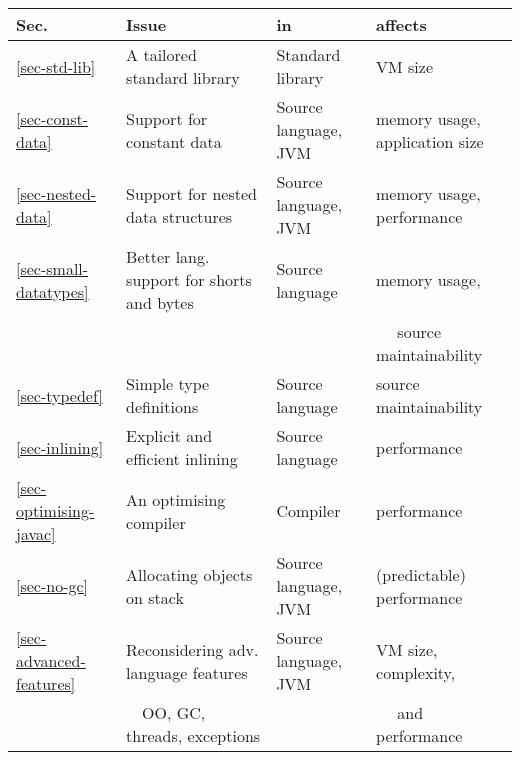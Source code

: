 \begin{tabular}{l|l|l|l}
\toprule
\bfseries Sec.              & \bfseries Issue                               & \bfseries in          & \bfseries affects \\
\midrule
\midrule
\ref{sec-std-lib}           & A tailored standard library                   & Standard library      & VM size \\
\ref{sec-const-data}        & Support for constant data                     & Source language, JVM  & memory usage, application size \\
\ref{sec-nested-data}       & Support for nested data structures            & Source language, JVM  & memory usage, performance \\
\ref{sec-small-datatypes}   & Better lang. support for shorts and bytes     & Source language       & memory usage, \\
                            &                                               &                       & ~~  source maintainability\\
\ref{sec-typedef}           & Simple type definitions                       & Source language       & source maintainability \\
\ref{sec-inlining}          & Explicit and efficient inlining               & Source language       & performance \\
\ref{sec-optimising-javac}  & An optimising compiler                        & Compiler              & performance \\
\ref{sec-no-gc}             & Allocating objects on stack                   & Source language, JVM  & (predictable) performance \\
\ref{sec-advanced-features} & Reconsidering adv. language features          & Source language, JVM  & VM size, complexity, \\
                            & ~~OO, GC, threads, exceptions                 &                       & ~~ and performance \\
\bottomrule
\end{tabular}
